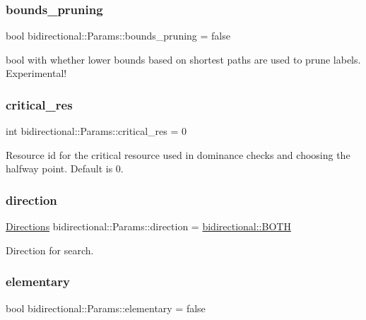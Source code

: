 \subsubsection{\texorpdfstring{bounds\+\_\+pruning}{bounds\_pruning}}
{\footnotesize\ttfamily bool bidirectional\+::\+Params\+::bounds\+\_\+pruning = false}

bool with whether lower bounds based on shortest paths are used to prune labels. Experimental! \mbox{\label{classbidirectional_1_1Params_a7d318c4af901a82c3f566d59c6de1b62}} 
\subsubsection{\texorpdfstring{critical\+\_\+res}{critical\_res}}
{\footnotesize\ttfamily int bidirectional\+::\+Params\+::critical\+\_\+res = 0}

Resource id for the critical resource used in dominance checks and choosing the halfway point. Default is 0. \mbox{\label{classbidirectional_1_1Params_a1d461034d1a1e04fa7f00cb63cd230d8}} 
\subsubsection{\texorpdfstring{direction}{direction}}
{\footnotesize\ttfamily \hyperlink{namespacebidirectional_a4cbe6f0bfbd3629c2cd44c98014aed70}{Directions} bidirectional\+::\+Params\+::direction = \hyperlink{namespacebidirectional_a4cbe6f0bfbd3629c2cd44c98014aed70ab50b3fbd895a667b43b3e9eb3bd54f85}{bidirectional\+::\+B\+O\+TH}}



Direction for search. 

\mbox{\label{classbidirectional_1_1Params_aa19060565463ffc251019a1dea026e6d}} 
\subsubsection{\texorpdfstring{elementary}{elementary}}
{\footnotesize\ttfamily bool bidirectional\+::\+Params\+::elementary = false}



